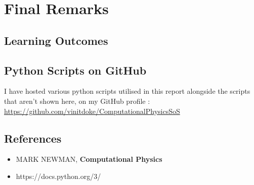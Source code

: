 \section{Final Remarks}
\subsection{Learning Outcomes}

\subsection{Python Scripts on GitHub}
I have hosted various python scripts utilised in this report alongside the scripts that aren't shown here, on my GitHub profile :  \href{https://github.com/vinitdoke/Computational_Physics_SoS_2020}{https://github.com/vinitdoke/Computational\textunderscore Physics\textunderscore SoS}
\subsection{References}
\begin{itemize}
	\item MARK NEWMAN, \textbf{ Computational Physics}
	\item https://docs.python.org/3/
	
	
\end{itemize}
